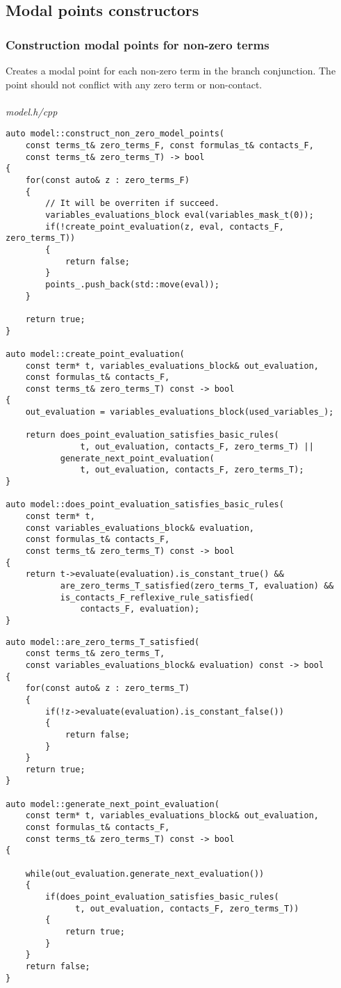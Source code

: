 \documentclass{article}
\begin{document}
	\newpage
	\subsection{Modal points constructors}
	\subsubsection*{Construction modal points for non-zero terms}
	Creates a modal point for each non-zero term in the branch conjunction. The point should not conflict with any zero term or non-contact.
\\
\\
\noindent
\textit{model.h/cpp}
\begin{lstlisting}
auto model::construct_non_zero_model_points(
	const terms_t& zero_terms_F, const formulas_t& contacts_F,
	const terms_t& zero_terms_T) -> bool
{
    for(const auto& z : zero_terms_F)
    {
        // It will be overriten if succeed.
        variables_evaluations_block eval(variables_mask_t(0));
        if(!create_point_evaluation(z, eval, contacts_F, zero_terms_T))
        {
            return false;
        }
        points_.push_back(std::move(eval));
    }

    return true;
}

auto model::create_point_evaluation(
	const term* t, variables_evaluations_block& out_evaluation,
	const formulas_t& contacts_F,
	const terms_t& zero_terms_T) const -> bool
{
    out_evaluation = variables_evaluations_block(used_variables_);

    return does_point_evaluation_satisfies_basic_rules(
               t, out_evaluation, contacts_F, zero_terms_T) ||
           generate_next_point_evaluation(
               t, out_evaluation, contacts_F, zero_terms_T);
}

auto model::does_point_evaluation_satisfies_basic_rules(
	const term* t,
	const variables_evaluations_block& evaluation,
	const formulas_t& contacts_F,
	const terms_t& zero_terms_T) const -> bool
{
    return t->evaluate(evaluation).is_constant_true() &&
           are_zero_terms_T_satisfied(zero_terms_T, evaluation) &&
           is_contacts_F_reflexive_rule_satisfied(
               contacts_F, evaluation);
}
\end{lstlisting}
\newpage
\begin{lstlisting}
auto model::are_zero_terms_T_satisfied(
	const terms_t& zero_terms_T,
	const variables_evaluations_block& evaluation) const -> bool
{
    for(const auto& z : zero_terms_T)
    {
        if(!z->evaluate(evaluation).is_constant_false())
        {
            return false;
        }
    }
    return true;
}

auto model::generate_next_point_evaluation(
	const term* t, variables_evaluations_block& out_evaluation,
	const formulas_t& contacts_F,
	const terms_t& zero_terms_T) const -> bool
{

    while(out_evaluation.generate_next_evaluation())
    {
        if(does_point_evaluation_satisfies_basic_rules(
              t, out_evaluation, contacts_F, zero_terms_T))
        {
            return true;
        }
    }
    return false;
}
\end{lstlisting}
\end{document}
